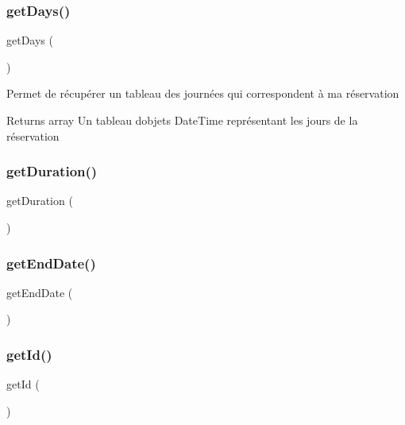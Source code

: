 \subsubsection{\texorpdfstring{getDays()}{getDays()}}
{\footnotesize\ttfamily get\+Days (\begin{DoxyParamCaption}{ }\end{DoxyParamCaption})}

Permet de récupérer un tableau des journées qui correspondent à ma réservation

\begin{DoxyReturn}{Returns}
array Un tableau d\textquotesingle{}objets Date\+Time représentant les jours de la réservation 
\end{DoxyReturn}
\mbox{\label{class_app_1_1_entity_1_1_booking_ab46fe3d2750728c84bd71ae1bfd08ee8}} 
\subsubsection{\texorpdfstring{getDuration()}{getDuration()}}
{\footnotesize\ttfamily get\+Duration (\begin{DoxyParamCaption}{ }\end{DoxyParamCaption})}

\mbox{\label{class_app_1_1_entity_1_1_booking_a5776ab464f7733284408dc2fa5e907e9}} 
\subsubsection{\texorpdfstring{getEndDate()}{getEndDate()}}
{\footnotesize\ttfamily get\+End\+Date (\begin{DoxyParamCaption}{ }\end{DoxyParamCaption})}

\mbox{\label{class_app_1_1_entity_1_1_booking_a12251d0c022e9e21c137a105ff683f13}} 
\subsubsection{\texorpdfstring{getId()}{getId()}}
{\footnotesize\ttfamily get\+Id (\begin{DoxyParamCaption}{ }\end{DoxyParamCaption})}

